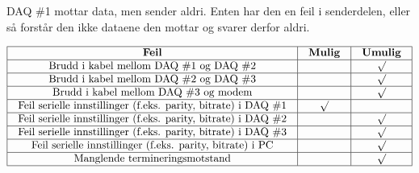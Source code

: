 












DAQ \#1 mottar data, men sender aldri. Enten har den en feil i senderdelen, eller så forstår den ikke dataene den mottar og svarer derfor aldri.


$$\vbox{\offinterlineskip
\halign{\strut
\vrule \quad\hfil # \ \hfil & 
\vrule \quad\hfil # \ \hfil & 
\vrule \quad\hfil # \ \hfil \vrule \cr
\noalign{\hrule}
%
{\bf Feil} & {\bf Mulig} & {\bf Umulig} \cr
%
\noalign{\hrule}
%
Brudd i kabel mellom DAQ \#1 og DAQ \#2 &  & $\surd$ \cr
%
\noalign{\hrule}
%
Brudd i kabel mellom DAQ \#2 og DAQ \#3 &  & $\surd$ \cr
%
\noalign{\hrule}
%
Brudd i kabel mellom DAQ \#3 og modem &  & $\surd$ \cr
%
\noalign{\hrule}
%
Feil serielle innstillinger (f.eks. parity, bitrate) i DAQ \#1 & $\surd$ &  \cr
%
\noalign{\hrule}
%
Feil serielle innstillinger (f.eks. parity, bitrate) i DAQ \#2 &  & $\surd$ \cr
%
\noalign{\hrule}
%
Feil serielle innstillinger (f.eks. parity, bitrate) i DAQ \#3 &  & $\surd$ \cr
%
\noalign{\hrule}
%
Feil serielle innstillinger (f.eks. parity, bitrate) i PC &  & $\surd$ \cr
%
\noalign{\hrule}
%
Manglende termineringsmotstand &  & $\surd$ \cr
%
\noalign{\hrule}
} %
}$$ %




